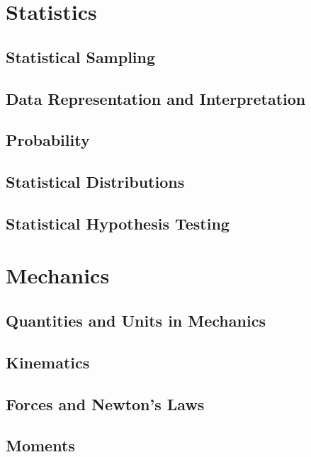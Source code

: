 \documentclass[a4paper]{report}
\begin{document}
\part{Statistics}

\chapter{Statistical Sampling}

\chapter{Data Representation and Interpretation}

\chapter{Probability}

\chapter{Statistical Distributions}

\chapter{Statistical Hypothesis Testing}

\part{Mechanics}

\chapter{Quantities and Units in Mechanics}

\chapter{Kinematics}

\chapter{Forces and Newton's Laws}

\chapter{Moments}
\end{document}
